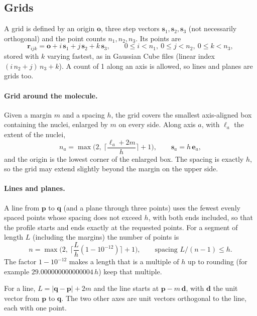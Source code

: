 \documentclass[11pt,a4paper]{article}
\begin{document}
\subsection{Grids}
A grid is defined by an origin $\mathbf o$, three step vectors
$\mathbf s_1,\mathbf s_2,\mathbf s_3$ (not necessarily orthogonal) and the
point counts $n_1,n_2,n_3$. Its points are
\begin{equation}
 \mathbf r_{ijk}=\mathbf o+i\,\mathbf s_1+j\,\mathbf s_2+k\,\mathbf s_3,
 \qquad 0\le i<n_1,\ 0\le j<n_2,\ 0\le k<n_3,
\end{equation}
stored with $k$ varying fastest, as in Gaussian Cube files (linear index
$(i\,n_2+j)\,n_3+k$). A count of 1 along an axis is allowed, so lines and
planes are grids too.

\paragraph{Grid around the molecule.} Given a margin $m$ and a spacing $h$,
the grid covers the smallest axis-aligned box containing the nuclei,
enlarged by $m$ on every side. Along axis $a$, with $\ell_a$ the extent of
the nuclei,
\begin{equation}
 n_a=\max\!\Big(2,\ \Big\lceil\frac{\ell_a+2m}{h}\Big\rceil+1\Big),\qquad
 \mathbf s_a=h\,\mathbf e_a ,
\end{equation}
and the origin is the lowest corner of the enlarged box. The spacing is
exactly $h$, so the grid may extend slightly beyond the margin on the upper
side.

\paragraph{Lines and planes.} A line from $\mathbf p$ to $\mathbf q$ (and a
plane through three points) uses the fewest evenly spaced points whose
spacing does not exceed $h$, with both ends included, so that the profile
starts and ends exactly at the requested points. For a segment of length
$L$ (including the margins) the number of points is
\begin{equation}
 n=\max\!\Big(2,\ \Big\lceil\frac{L}{h}(1-10^{-12})\Big\rceil+1\Big),
 \qquad\text{spacing } L/(n-1)\le h .
\end{equation}
The factor $1-10^{-12}$ makes a length that is a multiple of $h$ up to
rounding (for example $29.000000000000004\,h$) keep that multiple.

For a line, $L=|\mathbf q-\mathbf p|+2m$ and the line starts at
$\mathbf p-m\,\mathbf d$, with $\mathbf d$ the unit vector from $\mathbf p$
to $\mathbf q$. The two other axes are unit vectors orthogonal to the line,
each with one point.
\end{document}

